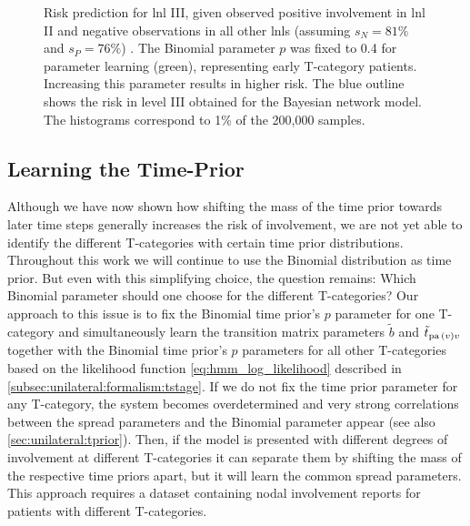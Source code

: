 \documentclass[\relativeRoot/main.tex]{subfiles}
\begin{document}
\begin{figure}
    \centering
    \def\svgwidth{0.7\textwidth}
    
    \caption[
        Ipsi LNL III risk dependent on time-prior parameter
    ]{
        Risk prediction for \gls{lnl} III, given observed positive involvement in \gls{lnl} II and negative observations in all other \glspl{lnl} (assuming $s_N = 81\%$ and $s_P = 76\%$) \cite{de_bondt_detection_2007}. The Binomial parameter $p$ was fixed to 0.4 for parameter learning (green), representing early T-category patients. Increasing this parameter results in higher risk. The blue outline shows the risk in level III obtained for the Bayesian network model. The histograms correspond to 1\% of the 200,000 samples.
    }
    \label{fig:unilateral:hmm_risk_increase}
\end{figure}

\subsection{Learning the Time-Prior}
\label{subsec:unilateral:application:tprior}

Although we have now shown how shifting the mass of the time prior towards later time steps generally increases the risk of involvement, we are not yet able to identify the different T-categories with certain time prior distributions. Throughout this work we will continue to use the Binomial distribution as time prior. But even with this simplifying choice, the question remains: Which Binomial parameter should one choose for the different T-categories? Our approach to this issue is to fix the Binomial time prior's $p$ parameter for one T-category and simultaneously learn the transition matrix parameters $\tilde{b}$ and $\tilde{t}_{\operatorname{pa}{(v)}v}$ together with the Binomial time prior's $p$ parameters for all other T-categories based on the likelihood function \cref{eq:hmm_log_likelihood} described in \cref{subsec:unilateral:formalism:tstage}. If we do not fix the time prior parameter for any T-category, the system becomes overdetermined and very strong correlations between the spread parameters and the Binomial parameter appear (see also \cref{sec:unilateral:tprior}). Then, if the model is presented with different degrees of involvement at different T-categories it can separate them by shifting the mass of the respective time priors apart, but it will learn the common spread parameters. This approach requires a dataset containing nodal involvement reports for patients with different T-categories.
\end{document}
